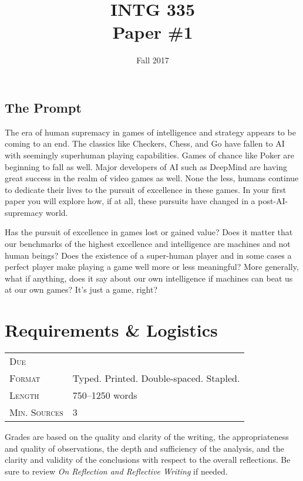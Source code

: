 \documentclass[nobib]{tufte-handout}
\title{INTG 335 \\ Paper \#1 }
\date{ Fall 2017 }
\begin{document}
\maketitle
\thispagestyle{empty}

\subsection*{The Prompt}

The era of human supremacy in games of intelligence and strategy appears to be coming to an end. The classics like Checkers, Chess, and Go have fallen to AI with seemingly superhuman playing capabilities. Games of chance like Poker are beginning to fall as well. Major developers of AI such as DeepMind are having great success in the realm of video games as well. None the less, humans continue to dedicate their lives to the pursuit of excellence in these games. In your first paper you will explore how, if at all, these pursuits have changed in a post-AI-supremacy world.

Has the pursuit of excellence in games lost or gained value? Does it matter that our benchmarks of the highest excellence and intelligence are machines and not human beings?  Does the existence of a super-human player and in some cases a perfect player make playing a game well more or less meaningful? More generally, what if anything, does it say about our own intelligence if machines can beat us at our own games? It's just a game, right?



\section{Requirements \& Logistics}

\begin{tabular}{ll}
\textsc{Due} &  \\
\textsc{Format} & Typed. Printed. Double-spaced. Stapled. \\
\textsc{Length} & 750--1250 words \\
\textsc{Min. Sources} & 3
\end{tabular}
\vspace{.25in}

Grades are based on the quality and clarity of the writing, the appropriateness and quality of observations, the depth and sufficiency of the analysis, and the clarity and validity of the conclusions with respect to the overall reflections. Be sure to review \textit{On Reflection and Reflective Writing} if needed.
\end{document}
